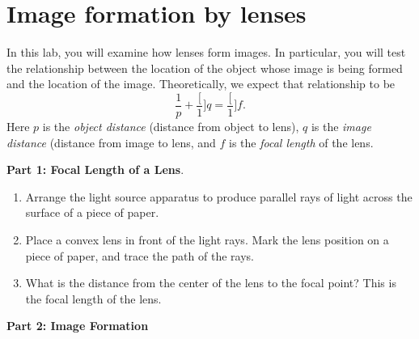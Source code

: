 \section{Image formation by lenses}

\makelabheader

In this lab, you will examine how lenses form images.  In particular,
you will test the relationship between the location of the object
whose image is being formed and the location of the image.  Theoretically,
we expect that relationship to be
$$
{\frac{1} p} + {\frac[1] q} = {\frac[1] f}.
$$
Here $p$ is the {\it object distance} (distance from object to lens),
$q$ is the {\it image distance} (distance from image to lens, and $f$
is the {\it focal length} of the lens.

\bigskip

{\bf Part 1: Focal Length of a Lens}.

\begin{enumerate}

\item Arrange the light source apparatus to produce parallel
rays of light across the surface of a piece of paper.
\item Place a convex lens in front of the
light rays.  Mark the lens position on a piece of paper, and trace
the path of the rays.
\item What is the distance from the center of the lens to the focal
point?  This is the focal length of the lens.

\answerspace{1in}

\end{enumerate}

\bigskip

{\bf Part 2: Image Formation}

